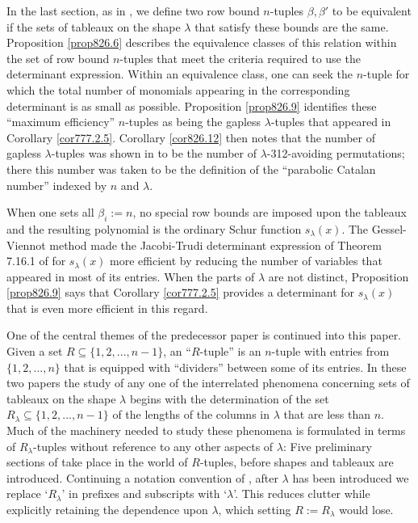 \documentclass[11pt]{article}
\theoremstyle{definition}
\theoremstyle{remark}
\numberwithin{equation}{section}
\begin{document}
\begin{spacing}{1.35}
In the last section, as in \cite{PW}, we define two row bound $n$-tuples $\beta, \beta'$ to be equivalent if the sets of tableaux on the shape $\lambda$ that satisfy these bounds are the same.  Proposition \ref{prop826.6} describes the equivalence classes of this relation within the set of row bound $n$-tuples that meet the criteria required to use the determinant expression.  Within an equivalence class, one can seek the $n$-tuple for which the total number of monomials appearing in the corresponding determinant is as small as possible.  Proposition \ref{prop826.9} identifies these ``maximum efficiency'' $n$-tuples as being the gapless $\lambda$-tuples that appeared in Corollary \ref{cor777.2.5}.  Corollary \ref{cor826.12} then notes that the number of gapless $\lambda$-tuples was shown in \cite{PW} to be the number of $\lambda$-312-avoiding permutations;  there this number was taken to be the definition of the ``parabolic Catalan number'' indexed by $n$ and $\lambda$.



When one sets all $\beta_i := n$, no special row bounds are imposed upon the tableaux and the resulting polynomial is the ordinary Schur function $s_\lambda(x)$.  The Gessel-Viennot method made the Jacobi-Trudi determinant expression of Theorem 7.16.1 of \cite{St2} for $s_\lambda(x)$ more efficient by reducing the number of variables that appeared in most of its entries.  When the parts of $\lambda$ are not distinct, Proposition \ref{prop826.9} says that Corollary \ref{cor777.2.5} provides a determinant for $s_\lambda(x)$ that is even more efficient in this regard.



One of the central themes of the predecessor paper \cite{PW} is continued into this paper.  Given a set $R \subseteq \{ 1, 2, ... , n-1 \}$, an ``$R$-tuple'' is an $n$-tuple with entries from $\{ 1, 2, ... , n \}$ that is equipped with ``dividers'' between some of its entries.  In these two papers the study of any one of the interrelated phenomena concerning sets of tableaux on the shape $\lambda$ begins with the determination of the set $R_\lambda \subseteq \{ 1, 2, ... , n-1 \}$ of the lengths of the columns in $\lambda$ that are less than $n$.  Much of the machinery needed to study these phenomena is formulated in terms of $R_\lambda$-tuples without reference to any other aspects of $\lambda$:  Five preliminary sections of \cite{PW} take place in the world of $R$-tuples, before shapes and tableaux are introduced.  Continuing a notation convention of \cite{PW}, after $\lambda$ has been introduced we replace `$R_\lambda$' in prefixes and subscripts with `$\lambda$'.  This reduces clutter while explicitly retaining the dependence upon $\lambda$, which setting $R := R_\lambda$ would lose.









\end{spacing}
\end{document}
